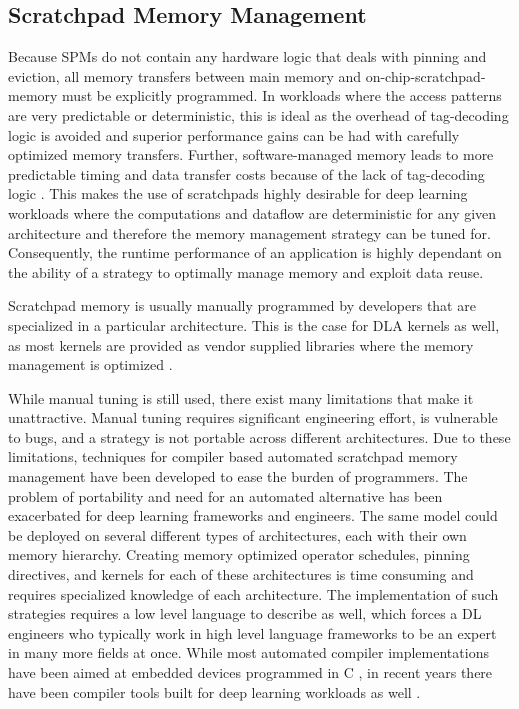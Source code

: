 \subsection{Scratchpad Memory Management}
Because SPMs do not contain any hardware logic that deals with pinning and
eviction, all memory transfers between main memory and on-chip-scratchpad-memory
must be explicitly programmed. In workloads where the access patterns are very
predictable or deterministic, this is ideal as the overhead of tag-decoding
logic is avoided and superior performance gains can be had with carefully
optimized memory transfers. Further, software-managed memory leads to more
predictable timing and data transfer costs because of the lack of
tag-decoding logic \cite{graphColoring}. This makes the use of scratchpads
highly desirable for deep learning workloads where the computations and
dataflow are deterministic for any given architecture and therefore the
memory management strategy can be tuned for. Consequently,
the runtime performance of an application is highly dependant on the
ability of a strategy to optimally manage memory and exploit data reuse.

Scratchpad memory is usually manually programmed by developers
that are specialized in a particular architecture. This is the case for
DLA kernels as well, as most kernels are provided as vendor supplied libraries
where the memory management is optimized \cite{TVM}.

While manual tuning is still used, there exist many limitations that make it
unattractive. Manual tuning requires significant engineering effort, is
vulnerable to bugs, and a strategy is not portable across different
architectures.  Due to these limitations, techniques for compiler based
automated scratchpad memory management have been developed to ease the burden
of programmers. The problem of portability and need for an automated
alternative has been exacerbated for deep learning frameworks and engineers.
The same model could be deployed on several different types of architectures,
each with their own memory hierarchy.  Creating memory optimized operator
schedules, pinning directives, and kernels for each of these architectures is
time consuming and requires specialized knowledge of each architecture. The
implementation of such strategies requires a low level language to describe as
well, which forces a DL engineers who typically work in high level language
frameworks to be an expert in many more fields at once.  While most automated
compiler implementations have been aimed at embedded devices programmed in C
\cite{graphColoring} \cite{memoryColoring}, in recent years there have been
compiler tools built for deep learning workloads as well \cite{onsram}
\cite{toplib}.

